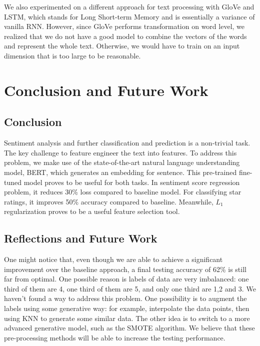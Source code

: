 \documentclass{article}
\begin{document}
We also experimented on a different approach for text processing with GloVe\cite{4} and LSTM, which stands for Long Short-term Memory and is essentially a variance of vanilla RNN. However, since GloVe performs transformation on word level, we realized that we do not have a good model to combine the vectors of the words and represent the whole text. Otherwise, we would have to train on an input dimension that is too large to be reasonable. 

\section{Conclusion and Future Work}
\subsection{Conclusion}

Sentiment analysis and further classification and prediction is a non-trivial task. The key challenge to feature engineer the text into features. To address this problem, we make use of the state-of-the-art natural language understanding model, BERT, which generates an embedding for sentence. This pre-trained fine-tuned model proves to be useful for both tasks. In sentiment score regression problem, it reduces 30\% loss compared to baseline model. For classifying star ratings, it improves 50\% accuracy compared to baseline. Meanwhile, $L_1$ regularization proves to be a useful feature selection tool. \\

\subsection{Reflections and Future Work}
One might notice that, even though we are able to achieve a significant improvement over the baseline approach, a final testing accuracy of 62\% is still far from optimal. One possible reason is labels of data are very imbalanced: one third of them are 4, one third of them are 5, and only one third are 1,2 and 3. We haven’t found a way to address this problem. One possibility is to augment the labels using some generative way: for example, interpolate the data points, then using KNN to generate some similar data. The other idea is to switch to a more advanced generative model, such as the SMOTE algorithm\cite{5}. 
 We believe that these pre-processing methods will be able to increase the testing performance. \\
\end{document}

